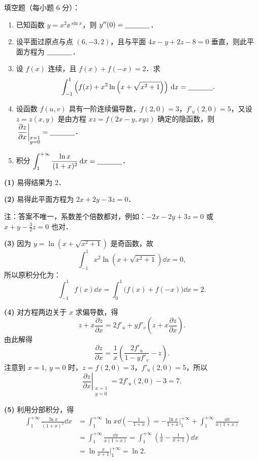 
填空题（每小题 6 分）：
\begin{enumerate}[label=(\arabic*)]
  \item 已知函数 $y=x^2\ee^{\sin x}$，则 $y''(0)=\underline{\hspace{3.5em}}$．
  \item 设平面过原点与点 $(6,-3,2)$，且与平面 $4x-y+2z-8=0$ 垂直，则此平面方程为 $\underline{\hspace{3.5em}}$．
  \item 设 $f(x)$ 连续，且 $f(x)+f(-x)=2$．求
  \[
  \int_{-1}^{1}\left(f(x)+x^2\ln\left(x+\sqrt{x^2+1}\right)\right)\,\mathrm{d} x=\underline{\hspace{3.5em}}.
  \]
  \item 设函数 $f(u,v)$ 具有一阶连续偏导数，$f(2,0)=3$，$f'_u(2,0)=5$，又设 $z=z(x,y)$ 是由方程 $xz=f(2x-y,xyz)$ 确定的隐函数，则 $\displaystyle \left.\frac{\partial z}{\partial x}\right|_{\substack{x=1\\y=0}}=\underline{\hspace{3.5em}}$．
  \item 积分 $\displaystyle \int_1^{+\infty}\frac{\ln x}{(1+x)^2}\,\mathrm{d} x=\underline{\hspace{3.5em}}$．
\end{enumerate}
\begin{solution}
\textbf{(1)} 易得结果为 $2$．

\textbf{(2)} 易得此平面方程为 $2x+2y-3z=0$．

注：答案不唯一，系数差个倍数都对，例如：$-2x-2y+3z=0$ 或 $x+y-\frac{3}{2}z=0$ 也对．

\textbf{(3)} 因为 $y=\ln\left(x+\sqrt{x^2+1}\right)$ 是奇函数，故
\[
\int_{-1}^{1}x^2\ln\left(x+\sqrt{x^2+1}\right)\dd x=0,
\]
所以原积分化为：
\[
\int_{-1}^{1}f(x)\dd x=\int_{0}^{1}\bigl(f(x)+f(-x)\bigr)\dd x=2.
\]

\textbf{(4)} 对方程两边关于 $x$ 求偏导数，得
\[
z+x\frac{\partial z}{\partial x}=2f'_u+yf'_v\left(z+x\frac{\partial z}{\partial x}\right).
\]
由此解得
\[
\frac{\partial z}{\partial x}=\frac{1}{x}\left(\frac{2f'_u}{1-yf'_v}-z\right).
\]
注意到 $x=1,\,y=0$ 时，$z=f(2,0)=3$，$f'_u(2,0)=5$，所以
\[
\left.\frac{\partial z}{\partial x}\right|_{\substack{x=1\\y=0}}=2f'_u(2,0)-3=7.
\]

\textbf{(5)} 利用分部积分，得
\begin{align*}
\int_1^{+\infty}\frac{\ln x}{(1+x)^2}\dd x
&=\int_1^{+\infty}\ln x\dd\left(-\frac{1}{1+x}\right)
=-\frac{\ln x}{1+x}\Big|_1^{+\infty}+\int_1^{+\infty}\frac{\dd x}{x(1+x)}\\
&=\int_1^{+\infty}\frac{\dd x}{x(1+x)}=\int_1^{+\infty}\left(\frac{1}{x}-\frac{1}{x+1}\right)\dd x\\
&=\ln\frac{x}{x+1}\Big|_1^{+\infty}=\ln 2.
\end{align*}
\end{solution}

